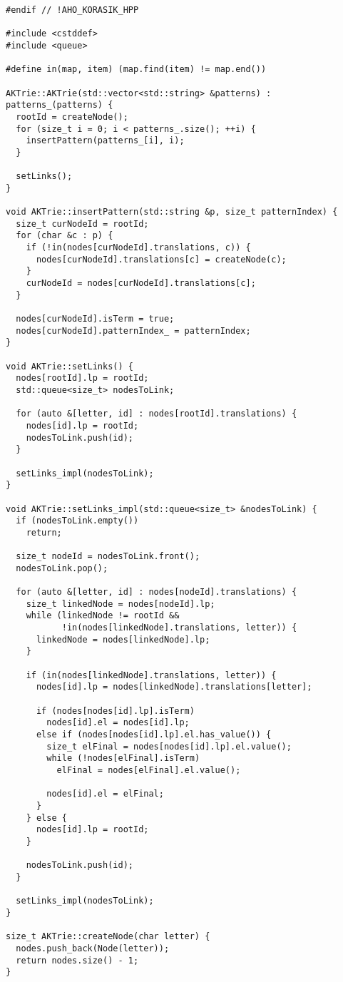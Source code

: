 \begin{verbatim}
#endif // !AHO_KORASIK_HPP

#include <cstddef>
#include <queue>

#define in(map, item) (map.find(item) != map.end())

AKTrie::AKTrie(std::vector<std::string> &patterns) : patterns_(patterns) {
  rootId = createNode();
  for (size_t i = 0; i < patterns_.size(); ++i) {
    insertPattern(patterns_[i], i);
  }

  setLinks();
}

void AKTrie::insertPattern(std::string &p, size_t patternIndex) {
  size_t curNodeId = rootId;
  for (char &c : p) {
    if (!in(nodes[curNodeId].translations, c)) {
      nodes[curNodeId].translations[c] = createNode(c);
    }
    curNodeId = nodes[curNodeId].translations[c];
  }

  nodes[curNodeId].isTerm = true;
  nodes[curNodeId].patternIndex_ = patternIndex;
}

void AKTrie::setLinks() {
  nodes[rootId].lp = rootId;
  std::queue<size_t> nodesToLink;

  for (auto &[letter, id] : nodes[rootId].translations) {
    nodes[id].lp = rootId;
    nodesToLink.push(id);
  }

  setLinks_impl(nodesToLink);
}

void AKTrie::setLinks_impl(std::queue<size_t> &nodesToLink) {
  if (nodesToLink.empty())
    return;

  size_t nodeId = nodesToLink.front();
  nodesToLink.pop();

  for (auto &[letter, id] : nodes[nodeId].translations) {
    size_t linkedNode = nodes[nodeId].lp;
    while (linkedNode != rootId &&
           !in(nodes[linkedNode].translations, letter)) {
      linkedNode = nodes[linkedNode].lp;
    }

    if (in(nodes[linkedNode].translations, letter)) {
      nodes[id].lp = nodes[linkedNode].translations[letter];

      if (nodes[nodes[id].lp].isTerm)
        nodes[id].el = nodes[id].lp;
      else if (nodes[nodes[id].lp].el.has_value()) {
        size_t elFinal = nodes[nodes[id].lp].el.value();
        while (!nodes[elFinal].isTerm)
          elFinal = nodes[elFinal].el.value();

        nodes[id].el = elFinal;
      }
    } else {
      nodes[id].lp = rootId;
    }

    nodesToLink.push(id);
  }

  setLinks_impl(nodesToLink);
}

size_t AKTrie::createNode(char letter) {
  nodes.push_back(Node(letter));
  return nodes.size() - 1;
}


\end{verbatim}
